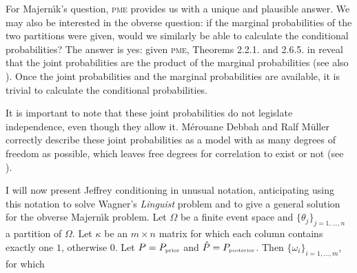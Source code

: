 \documentclass[phd,12pt,oneside]{ubcthesis}
\begin{document}
For Majern{\'\i}k's question, \textsc{pme} provides us with a unique
and plausible answer. We may also be interested in the obverse
question: if the marginal probabilities of the two partitions were
given, would we similarly be able to calculate the conditional
probabilities? The answer is yes: given \textsc{pme}, Theorems 2.2.1.
and 2.6.5. in  reveal that the joint
probabilities are the product of the marginal probabilities (see also
). Once the joint probabilities and the
marginal probabilities are available, it is trivial to calculate the
conditional probabilities.

It is important to note that these joint probabilities do not
legislate independence, even though they allow it. M{\'e}rouane Debbah
and Ralf M{\"u}ller correctly describe these joint probabilities as a
model with as many degrees of freedom as possible, which leaves free
degrees for correlation to exist or not (see
). 




I will now present Jeffrey conditioning in unusual notation,
anticipating using this notation to solve Wagner's \emph{Linguist}
problem and to give a general solution for the obverse Majern{\'\i}k
problem. Let $\Omega$ be a finite event space and
$\{\theta_{j}\}_{j=1,\ldots,n}$ a partition of $\Omega$. Let $\kappa$
be an $m\times{}n$ matrix for which each column contains exactly one
$1$, otherwise $0$. Let $P=P_{\mbox{\tiny{prior}}}$ and
$\hat{P}=P_{\mbox{\tiny{posterior}}}$. Then
$\{\omega_{i}\}_{i=1,\ldots,m}$, for which
\end{document}
